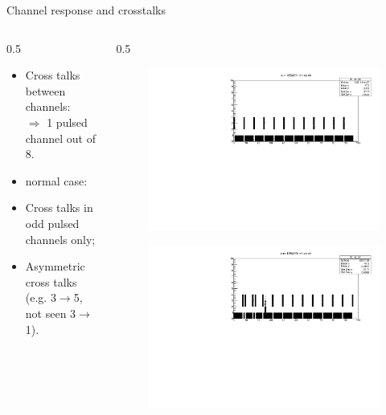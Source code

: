 \documentclass{beamer}[10pt]
\begin{document}
\begin{frame}{Channel response and crosstalks}
\begin{columns}
\begin{column}{0.5\framewidth}
\vspace{-2mm}
\begin{itemize}
\item Cross talks between channels:
\\
$\Rightarrow$ 1 pulsed channel out of 8.
\item normal case:
\end{itemize}
\vspace{20mm}
\begin{itemize}
\item  Cross talks in odd pulsed channels only;
\item  Asymmetric cross talks (e.g. 3$\rightarrow$5, not seen 3$\rightarrow$1).
\end{itemize}
\end{column}
\begin{column}{0.5\framewidth}
\begin{figure}[H]
   \centering
   \includegraphics[width= 1.0\columnwidth]{figures/pdf/nhitsvsch_105421.pdf}
   \label{fig:wfgkghl}
 \end{figure}
\vspace{2mm}
\begin{figure}[H]
   \centering
   \includegraphics[width= 1.0\columnwidth]{figures/pdf/nhitsvsch_105420.pdf}

\end{figure}
\end{column}
\end{columns}
\end{frame}
\end{document}
